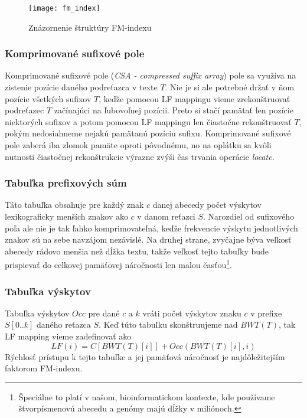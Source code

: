     \begin{figure}[h]
        \centering
        \texttt{[image: fm\_index]}
        \caption{Znázornenie štruktúry FM-indexu}
        \label{fig:fm_index}
    \end{figure}
    
    \subsubsection{Komprimované sufixové pole}
    Komprimované sufixové pole (\emph{CSA - compressed suffix array}) pole sa využíva na zistenie pozície daného podreťazca v texte $T$. Nie je si ale potrebné držať v ňom pozície všetkých sufixov $T$, keďže pomocou LF mappingu vieme zrekonštruovať podreťazec $T$ začínajúci na ľubovoľnej pozícii. Preto si stačí pamätať len pozície niektorých sufixov a potom pomocou LF mappingu len čiastočne rekonštruovať $T$, pokým nedosiahneme nejakú pamätanú pozíciu sufixu. Komprimované sufixové pole zaberá iba zlomok pamäte oproti pôvodnému, no na oplátku sa kvôli nutnosti čiastočnej rekonštrukcie výrazne zvýši čas trvania operácie \emph{locate}.
    
    \subsubsection{Tabuľka prefixových súm}
    Táto tabuľka obsahuje pre každý znak $c$ danej abecedy počet výskytov lexikograficky menších znakov ako $c$ v danom reťazci $S$. Narozdiel od sufixového poľa ale nie je tak ľahko komprimovateľná, keďže frekvencie výskytu jednotlivých znakov sú na sebe navzájom nezávislé. Na druhej strane, zvyčajne býva veľkosť abecedy rádovo menšia než dĺžka textu, takže veľkosť tejto tabuľky bude prispievať do celkovej pamäťovej náročnosti len malou časťou\footnote{Špeciálne to platí v našom, bioinformatickom kontexte, kde používame štvorpísmenovú abecedu a genómy majú dĺžky v miliónoch.}.
    
    \subsubsection{Tabuľka výskytov}
    Tabuľka výskytov $Occ$ pre dané $c$ a $k$ vráti počet výskytov znaku $c$ v prefixe $S[0..k]$ daného reťazca $S$. Keď túto tabuľku skonštruujeme nad $BWT(T)$, tak LF mapping vieme zadefinovať ako $$LF(i) = C[BWT(T)[i]] + Occ(BWT(T)[i], i)$$
    Rýchlosť prístupu k tejto tabuľke a jej pamäťová náročnosť je najdôležitejším faktorom FM-indexu. 
    

